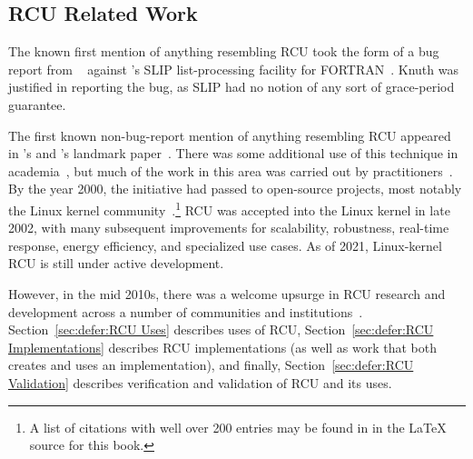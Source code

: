 
\subsection{RCU Related Work}
\label{sec:defer:RCU Related Work}

The known first mention of anything resembling RCU took the form of a bug
report from
~\cite[page 413 of Fundamental Algorithms]{Knuth73}
against 's SLIP list-processing facility for
FORTRAN~\cite{Weizenbaum:1963:SLP:367593.367617}.
Knuth was justified in reporting the bug, as SLIP had no notion of
any sort of grace-period guarantee.

The first known non-bug-report mention of anything resembling RCU appeared
in 's and 's landmark
paper~\cite{Kung80}.
There was some additional use of this technique in
academia~\cite{Manber82,Manber84,BarbaraLiskov1988ArgusCACM,Pugh90,Andrews91textbook,Pu95a,Cowan96a,Rastogi:1997:LPV:645923.671017,Gamsa99},
but much of the work in this area was carried out by
practitioners~\cite{RichardRashid87a,Hennessy89,Jacobson93,AjuJohn95,Slingwine95,Slingwine97,Slingwine98,McKenney98}.
By the year 2000, the initiative had passed to open-source projects,
most notably the Linux kernel
community~\cite{RustyRussell2000a,RustyRussell2000b,McKenney01b,McKenney01a,McKenney02a,Arcangeli03}.\footnote{
	A list of citations with well over 200 entries may be found in
	 in the {\LaTeX} source for this book.}
RCU was accepted into the Linux kernel in late 2002, with many subsequent
improvements for scalability, robustness, real-time response, energy
efficiency, and specialized use cases.
As of 2021, Linux-kernel RCU is still under active development.

However, in the mid 2010s, there was a welcome upsurge in RCU research
and development across a number of communities and
institutions~\cite{FransKaashoek2015ParallelOSHistory}.
Section~\ref{sec:defer:RCU Uses} describes uses of RCU,
Section~\ref{sec:defer:RCU Implementations} describes RCU implementations
(as well as work that both creates and uses an implementation),
and finally,
Section~\ref{sec:defer:RCU Validation} describes verification and validation
of RCU and its uses.

